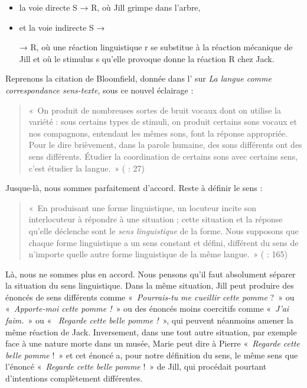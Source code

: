 \begin{itemize}
\item 
la voie directe S → R, où Jill grimpe dans l’arbre,
\item 
et la voie indirecte S →  → R, où une réaction linguistique r se substitue à la réaction mécanique de Jill et où le stimulus s qu’elle provoque donne la réaction R chez Jack.
\end{itemize}

Reprenons la citation de Bloomfield, donnée dans l’ sur \textit{La langue comme correspondance sens-texte}, sous ce nouvel éclairage :

\begin{quote}
    «~On produit de nombreuses sortes de bruit vocaux dont on utilise la variété : sous certains types de stimuli, on produit certains sons vocaux et nos compagnons, entendant les mêmes sons, font la réponse appropriée. Pour le dire brièvement, dans la parole humaine, des sons différents ont des sens différents. Étudier la coordination de certains sons avec certains sens, c’est étudier la langue.~» (\citealt{bloomfield1933language} : 27)
\end{quote}

\noindent Jusque-là, nous sommes parfaitement d’accord. Reste à définir le sens :

\begin{quote}
    «~En produisant une forme linguistique, un locuteur incite son interlocuteur à répondre à une situation ; cette situation et la réponse qu’elle déclenche sont le \textit{sens linguistique} de la forme. Nous supposons que chaque forme linguistique a un sens constant et défini, différent du sens de n’importe quelle autre forme linguistique de la même langue.~» (\citealt{bloomfield1933language} : 165)
\end{quote}

\noindent Là, nous ne sommes plus en accord. Nous pensons qu’il faut absolument séparer la situation du sens linguistique. Dans la même situation, Jill peut produire des énoncés de sens différents comme «~\textit{Pourrais-tu} \textit{me cueillir cette pomme} ?~» ou «~\textit{Apporte-moi cette pomme !~}» ou des énoncés moins coercitifs comme «~\textit{J’ai faim.}~» ou «~ \textit{Regarde cette belle pomme !~}», qui peuvent néanmoins amener la même réaction de Jack. Inversement, dans une tout autre situation, par exemple face à une nature morte dans un musée, Marie peut dire à Pierre «~\textit{Regarde cette belle pomme} !~» et cet énoncé a, pour notre définition du sens, le même sens que l’énoncé «~\textit{Regarde cette belle pomme} !~» de Jill, qui procédait pourtant d’intentions complètement différentes.

